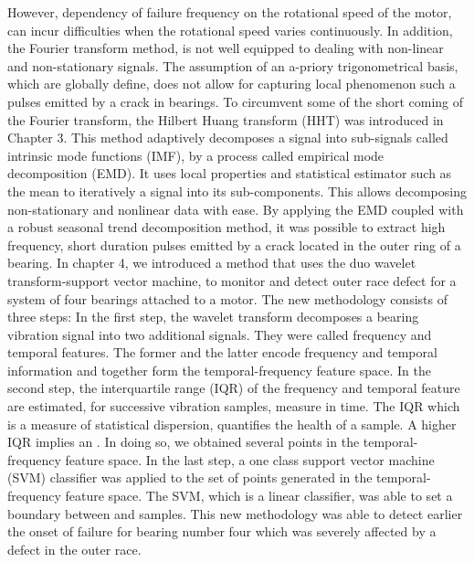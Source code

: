 \documentclass[thesis.tex]{subfiles}
\begin{document}
	\justify
	However, dependency of failure frequency on the rotational speed of the motor, can incur difficulties when the rotational speed varies continuously. In addition, the Fourier transform method, is not well equipped to dealing with non-linear and non-stationary signals. The assumption of an a-priory trigonometrical basis, which are globally define, does not allow for capturing local phenomenon such a pulses emitted by a crack in bearings.
	\justify
	To circumvent some of the short coming of the Fourier transform, the Hilbert Huang transform (HHT) was introduced in Chapter 3.
	This method adaptively decomposes a signal into sub-signals called intrinsic mode functions (IMF), by a process called empirical mode decomposition (EMD). It uses local properties and statistical estimator such as the mean to iteratively
	 a signal into its sub-components. This allows decomposing non-stationary and nonlinear data with ease.
	By applying the EMD coupled with a robust seasonal trend decomposition method, it was possible to extract high frequency, short duration pulses emitted by a crack located in the outer ring of a bearing.
	\justify
	In chapter 4, we introduced a method that uses the duo wavelet transform-support vector machine, to monitor and detect outer race defect for a system of four bearings attached to a motor. The new methodology consists of three steps: In the first step, the wavelet transform decomposes a bearing vibration signal into two additional signals. They were called frequency and temporal features. The former and the latter encode frequency and temporal information and together form the temporal-frequency feature space. In the second step, the interquartile range (IQR) of the frequency and temporal feature are estimated, for successive vibration samples, measure in time. The IQR which is a measure of statistical dispersion, quantifies the health of a sample. A higher IQR implies an . In doing so, we obtained several points in the temporal-frequency feature space.
	\justify
	In the last step, a one class support vector machine (SVM) classifier was applied to the set of points generated in the temporal-frequency feature space. The SVM, which is a linear classifier, was able to set a boundary between  and  samples.
	This new methodology was able to detect earlier the onset of failure for bearing number four which was severely affected by a defect in the outer race.
	
	
	 
\end{document}
